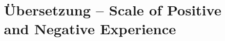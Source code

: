 %
%
\glsresetall

\let\raggedsection\centering 
\chapter{Übersetzung -- Scale of Positive and Negative Experience}\label{chap.appendix_spane}
\let\raggedsection\raggedright 
